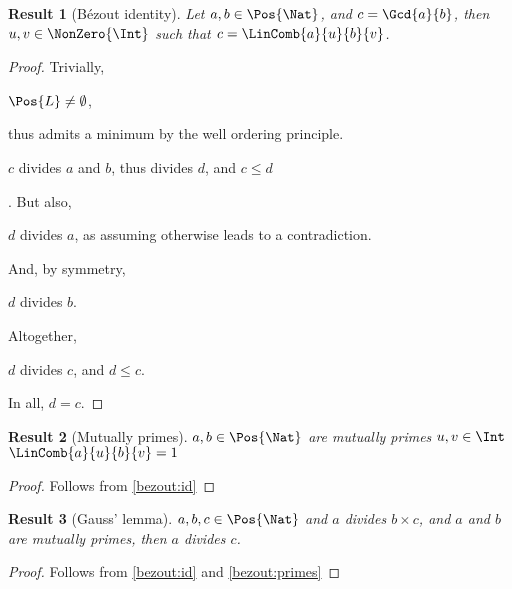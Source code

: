 \documentclass{article} %
\newtheorem{result}{Result}
\begin{document}
\begin{result}[Bézout identity]\label{bezout:id}
  Let $a,b\in \Pos{\Nat}$, and $c=\Gcd{a}{b}$, then \Exists $u,v\in \NonZero{\Int}$ such that $c=\LinComb{a}{u}{b}{v}$. 
%  
\end{result}
\begin{proof}
  Trivially, 
  \begin{inlsteps}
  \item $\Pos{L}\neq\emptyset$, 
  \end{inlsteps} thus admits a minimum by the well ordering principle.
  \begin{inlsteps}[resume]
  \item $c$ divides $a$ and $b$, thus divides $d$, and $c\leq d$
    \label{bezout:id:leq}
  \end{inlsteps}. But also,
  \begin{inlsteps}[resume]
  \item $d$ divides $a$, as assuming otherwise leads to a contradiction. 
  \end{inlsteps} And, by symmetry,
  \begin{inlsteps}[resume]
  \item $d$ divides $b$.~
  \end{inlsteps}Altogether,~
  \begin{inlsteps}[resume]
  \item $d$ divides $c$, and $d\leq c$.~
    \label{bezout:id:geq}
  \end{inlsteps}In all, $d=c$.
\end{proof}

\begin{result}[Mutually primes]\label{bezout:primes}
  $a,b\in \Pos{\Nat}$ are mutually primes \Iff \Exists
  $u,v\in \Int$ $\LinComb{a}{u}{b}{v}=1$
\end{result}\begin{proof}Follows from \autoref{bezout:id}\end{proof}

\begin{result}[Gauss' lemma]\label{bezout:primes}
  $a,b,c\in \Pos{\Nat}$ and $a$ divides $b\times c$,
  and $a$ and $b$ are mutually primes, then $a$ divides $c$.
\end{result}\begin{proof}Follows from \autoref{bezout:id} and \autoref{bezout:primes}
\end{proof}

\end{document}
